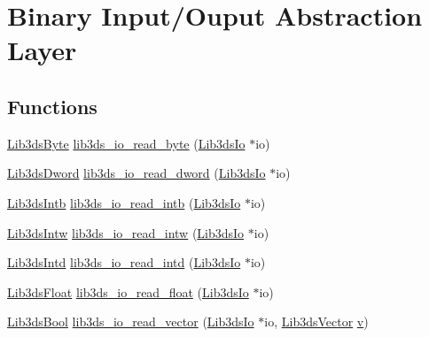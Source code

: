 \hypertarget{group__io}{\section{Binary Input/\-Ouput Abstraction Layer}
\label{group__io}
}
\subsection*{Functions}
\begin{DoxyCompactItemize}
\item 
\hyperlink{types_8h_a0b5424d44e4d56efb0ec0c398eeb7d3d}{Lib3ds\-Byte} \hyperlink{group__io_gad9b55ddd41c145cc3ef16bc95b0f42a7}{lib3ds\-\_\-io\-\_\-read\-\_\-byte} (\hyperlink{struct_lib3ds_io}{Lib3ds\-Io} $\ast$io)
\item 
\hyperlink{types_8h_a299c9663303144c562f6bd92c2f273d3}{Lib3ds\-Dword} \hyperlink{group__io_gaa4767b453402470eaae627dd81e2b98e}{lib3ds\-\_\-io\-\_\-read\-\_\-dword} (\hyperlink{struct_lib3ds_io}{Lib3ds\-Io} $\ast$io)
\item 
\hyperlink{types_8h_aeaf8777e4724248631641efccc8fc0ce}{Lib3ds\-Intb} \hyperlink{group__io_ga9d285025ad9778f96a27be6254d9ffaa}{lib3ds\-\_\-io\-\_\-read\-\_\-intb} (\hyperlink{struct_lib3ds_io}{Lib3ds\-Io} $\ast$io)
\item 
\hyperlink{types_8h_ad6ca098afd6494c3cca6b63f136f59c8}{Lib3ds\-Intw} \hyperlink{group__io_ga51120307796b9f87181ac7c8108b85fb}{lib3ds\-\_\-io\-\_\-read\-\_\-intw} (\hyperlink{struct_lib3ds_io}{Lib3ds\-Io} $\ast$io)
\item 
\hyperlink{types_8h_a5d92ad41149cf040ce2ee32cc2609403}{Lib3ds\-Intd} \hyperlink{group__io_ga9dda34fe900ea2a0be6c1ec0f4c282b1}{lib3ds\-\_\-io\-\_\-read\-\_\-intd} (\hyperlink{struct_lib3ds_io}{Lib3ds\-Io} $\ast$io)
\item 
\hyperlink{types_8h_ab18e70f51f9a53c9dee8d930c8e1a7bf}{Lib3ds\-Float} \hyperlink{group__io_ga63484eed30e7e28e4ad8f821f9e1e6fa}{lib3ds\-\_\-io\-\_\-read\-\_\-float} (\hyperlink{struct_lib3ds_io}{Lib3ds\-Io} $\ast$io)
\item 
\hyperlink{types_8h_a89dd7398a9ebbbf28011f8c32df67ad3}{Lib3ds\-Bool} \hyperlink{group__io_ga659a4e72d9e80fe4415a4d25f2f13165}{lib3ds\-\_\-io\-\_\-read\-\_\-vector} (\hyperlink{struct_lib3ds_io}{Lib3ds\-Io} $\ast$io, \hyperlink{group__vector_ga6ac1c3b3ef15381ebf6baf264d658dcf}{Lib3ds\-Vector} \hyperlink{glext_8h_a14cfbe2fc2234f5504618905b69d1e06}{v})
\item 

\end{DoxyCompactItemize}
